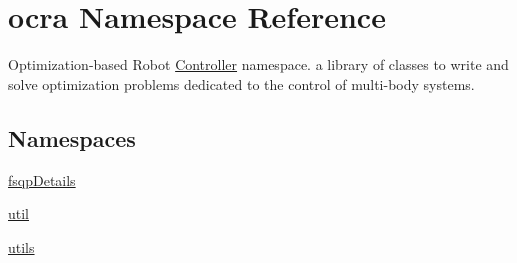 \hypertarget{namespaceocra}{}\section{ocra Namespace Reference}
\label{namespaceocra}


Optimization-\/based Robot \hyperlink{classocra_1_1Controller}{Controller} namespace. a library of classes to write and solve optimization problems dedicated to the control of multi-\/body systems.  


\subsection*{Namespaces}
\begin{DoxyCompactItemize}
\item 
 \hyperlink{namespaceocra_1_1fsqpDetails}{fsqp\+Details}
\item 
 \hyperlink{namespaceocra_1_1util}{util}
\item 
 \hyperlink{namespaceocra_1_1utils}{utils}
\end{DoxyCompactItemize}
